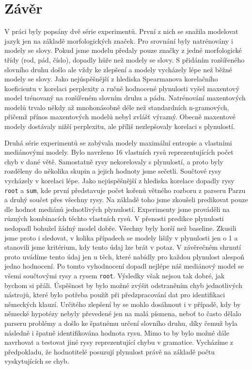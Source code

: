 \documentclass[12pt,a4paper]{report}
\def\chapwithtoc#1{
\chapter*{#1}
\addcontentsline{toc}{chapter}{#1}
}
\begin{document}
\chapwithtoc{Závěr}
V práci byly popsány dvě série experimentů. První z nich se snažila modelovat jazyk jen na základě morfologických značek. Pro srovnání byly natrénovány i modely se slovy. Pokud jsme modelu předaly pouze značky z jedné morfologické třídy (rod, pád, číslo), dopadly hůře než modely se slovy. S přidáním rozšířeného slovního druhu došlo ale vždy ke zlepšení a modely vycházely lépe než běžné modely se slovy. Jako nejúspěšnější z hlediska Spearmanova korelačního koeficientu v korelaci perplexity a ručně hodnocené plynulosti vyšel maxentový model trénovaný na rozšířeném slovním druhu a pádu. Natrénování maxentových modelů trvalo někdy až mnohonásobně déle než standardních n-gramových, přičemž přínos maxentových modelů nebyl zvlášť výrazný. Obecně maxentové modely dostávaly nižší perplexitu, ale příliš nezlepšovaly korelaci s plynulostí.

Druhá série experimentů se zabývala modely maximální entropie a vlastními mediánovými modely. Bylo navrženo 16 vlastních rysů reprezentujících počet chyb v dané větě. Samostatně rysy nekorelovaly s plynulostí, a proto byly rozděleny do několika skupin a jejich hodnoty jsme sečetli. Součtové rysy vycházely v korelaci lépe. Jako nejúspěšnější z hlediska korelace dopadly rysy \texttt{root} a \texttt{sum}, kde první představuje počet kořenů větného rozboru z parseru Parzu a druhý součet přes všechny rysy. Na základě toho jsme zkoušeli predikovat pouze dle hodnot mediánů jednotlivých plynulostí. Experimenty jsme prováděli na různých kombinacích těchto vlastních rysů. V přenosti predikce plynulosti nedopadl bohužel žádný model dobře. Všechny byly horší než baseline. Zkusili jsme proto i sledovat, v kolika případech se modely lišily v plynulosti jen o 1 a stanovili jsme kritérium, kdy tento údaj lze brát v potaz. V závěrečném shrnutí proto uvádíme tento údaj jen u těch, které nabídly pro každou plynulost alespoň jedno hodnocení. Po tomto vyhodnocení dopadl nejlépe náš mediánový model se všemi součtovými rysy a rysem \texttt{root}. Výsledky však nejsou tak dobré, jak bychom si přáli. Úspěšnost by bylo možné zvýšit odstraněním chyb jednotlivých nástrojů, které bylo potřeba použít při předzpracování dat pro identifikaci německých klauzí. Určitého zlepšení by se mohlo dosáhnout i v případě, kdy by německé hypotézy nebyly převedené jen na malá písmena, neboť to často dělalo parseru problémy a došlo ke špatnému určení slovního druhu, díky čemuž byla následně i špatně identifikována hodnota rysu. Mimo to by bylo možné dále navrhovat a testovat jiné rysy reprezentující chybu v gramatice. Vycházíme z předpokladu, že hodnotitelé posuzují plynulost právě na základě počtu vyskytujících se chyb.
\end{document}
